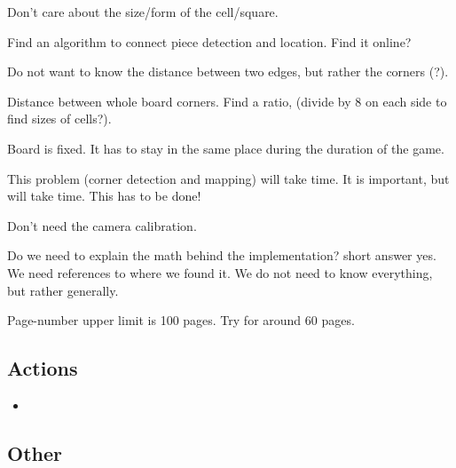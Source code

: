 Don't care about the size/form of the cell/square. 

Find an algorithm to connect piece detection and location. Find it online?

Do not want to know the distance between two edges, but rather the corners (?). 

Distance between whole board corners. Find a ratio, (divide by 8 on each side to find sizes of cells?).

Board is fixed. It has to stay in the same place during the duration of the game.

This problem (corner detection and mapping) will take time. It is important, but will take time. This has to be done!

Don't need the camera calibration. 

Do we need to explain the math behind the implementation? short answer yes. We need references to where we found it. We do not need to know everything, but rather generally. 

Page-number upper limit is 100 pages. Try for around 60 pages.

\subsection{Actions}
\begin{itemize}
    \item 
\end{itemize}

\subsection{Other}

